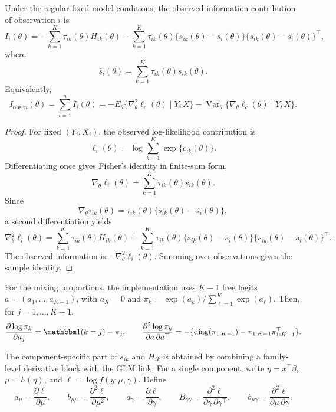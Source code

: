\begin{theorem}
\label{thm:louis}
Under the regular fixed-model conditions, the observed information contribution
of observation \(i\) is
\[
    I_i(\theta)
    =
    -\sum_{k=1}^K\tau_{ik}(\theta)H_{ik}(\theta)
    -
    \sum_{k=1}^K\tau_{ik}(\theta)
    \{s_{ik}(\theta)-\bar s_i(\theta)\}
    \{s_{ik}(\theta)-\bar s_i(\theta)\}^\top,
\]
where
\[
    \bar s_i(\theta)=\sum_{k=1}^K\tau_{ik}(\theta)s_{ik}(\theta).
\]
Equivalently,
\[
    I_{\mathrm{obs},n}(\theta)
    =
    \sum_{i=1}^n I_i(\theta)
    =
    -E_\theta\{\nabla_\theta^2\ell_c(\theta)\mid Y,X\}
    -
    \operatorname{Var}_\theta\{\nabla_\theta\ell_c(\theta)\mid Y,X\}.
\]
\end{theorem}

\begin{proof}
For fixed \((Y_i,X_i)\), the observed log-likelihood contribution is
\[
    \ell_i(\theta)=\log\sum_{k=1}^K\exp\{c_{ik}(\theta)\}.
\]
Differentiating once gives Fisher's identity in finite-sum form,
\[
    \nabla_\theta\ell_i(\theta)
    =
    \sum_{k=1}^K\tau_{ik}(\theta)s_{ik}(\theta).
\]
Since
\[
    \nabla_\theta\tau_{ik}(\theta)
    =
    \tau_{ik}(\theta)\{s_{ik}(\theta)-\bar s_i(\theta)\},
\]
a second differentiation yields
\[
    \nabla_\theta^2\ell_i(\theta)
    =
    \sum_{k=1}^K\tau_{ik}(\theta)H_{ik}(\theta)
    +
    \sum_{k=1}^K\tau_{ik}(\theta)
    \{s_{ik}(\theta)-\bar s_i(\theta)\}
    \{s_{ik}(\theta)-\bar s_i(\theta)\}^\top.
\]
The observed information is \(-\nabla_\theta^2\ell_i(\theta)\).  Summing over
observations gives the sample identity.
\end{proof}

For the mixing proportions, the implementation uses \(K-1\) free logits
\(a=(a_1,\ldots,a_{K-1})\), with \(a_K=0\) and
\(\pi_k=\exp(a_k)/\sum_{\ell=1}^K\exp(a_\ell)\).  Then, for
\(j=1,\ldots,K-1\),
\[
    \frac{\partial\log\pi_k}{\partial a_j}
    =
    \mathbbm 1(k=j)-\pi_j,
    \qquad
    \frac{\partial^2\log\pi_k}{\partial a\,\partial a^\top}
    =
    -\{\operatorname{diag}(\pi_{1:K-1})
    -\pi_{1:K-1}\pi_{1:K-1}^\top\}.
\]

The component-specific part of \(s_{ik}\) and \(H_{ik}\) is obtained by
combining a family-level derivative block with the GLM link.  For a single
component, write \(\eta=x^\top\beta\), \(\mu=h(\eta)\), and
\(\ell=\log f(y;\mu,\gamma)\).  Define
\[
    a_\mu=\frac{\partial \ell}{\partial\mu},\qquad
    b_{\mu\mu}=\frac{\partial^2\ell}{\partial\mu^2},\qquad
    a_\gamma=\frac{\partial\ell}{\partial\gamma},\qquad
    B_{\gamma\gamma}=\frac{\partial^2\ell}{\partial\gamma\,\partial\gamma^\top},
    \qquad
    b_{\mu\gamma}=\frac{\partial^2\ell}{\partial\mu\,\partial\gamma}.
\]

